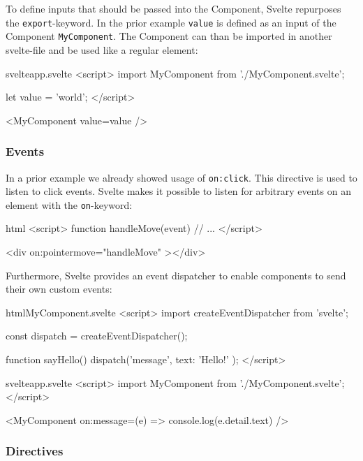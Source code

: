 To define inputs that should be passed into the Component, Svelte repurposes the \texttt{export}-keyword. In the prior example \texttt{value} is defined as an input of the Component \texttt{MyComponent}. The Component can than be imported in another svelte-file and be used like a regular element:

\begin{myminted}{svelte}{app.svelte}
<script>
  import MyComponent from './MyComponent.svelte';

  let value = 'world';
</script>

<MyComponent value={value} />
\end{myminted}

\subsubsection{Events}

In a prior example we already showed usage of \texttt{on:click}. This directive is used to listen to click events. Svelte makes it possible to listen for arbitrary events on an element with the \texttt{on}-keyword:

\begin{myminted}[highlightlines={7}]{html}{}
<script>
  function handleMove(event) {
    // ...
  }
</script>

<div on:pointermove="{handleMove}" ></div>
\end{myminted}

Furthermore, Svelte provides an event dispatcher to enable components to send their own custom events:

\begin{myminted}{html}{MyComponent.svelte}
<script>
  import { createEventDispatcher } from 'svelte';

  const dispatch = createEventDispatcher();

  function sayHello() {
    dispatch('message', {
      text: 'Hello!'
    });
  }
</script>
\end{myminted}
\begin{myminted}{svelte}{app.svelte}
<script>
  import MyComponent from './MyComponent.svelte';
</script>

<MyComponent on:message={(e) => console.log(e.detail.text)} />
\end{myminted}

\subsubsection{Directives}
\label{sec:svelte-directives}

